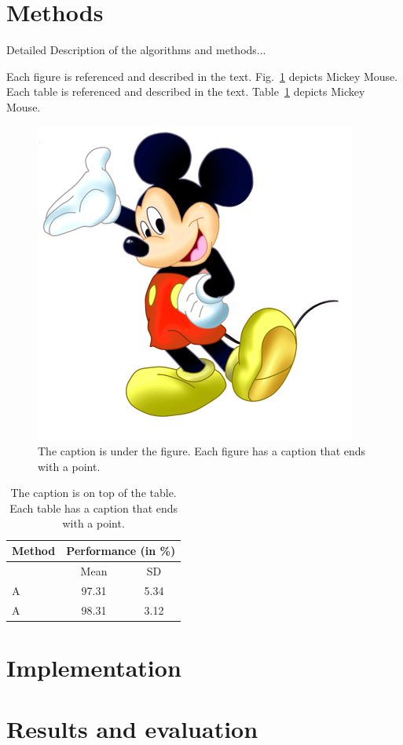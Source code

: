 \documentclass[12pt,onecolumn]{article}
\begin{document}
\newpage
\section{Methods}
\label{sec:methods}

Detailed Description of the algorithms and methods...


Each figure is referenced and described in the text. Fig.~\ref{fig:01} depicts Mickey Mouse.
Each table is referenced and described in the text. Table~\ref{table:01} depicts Mickey Mouse.

\begin{figure}[h]
\centering %
\includegraphics[width=0.5\columnwidth]{mickey.png}
\caption{The caption is under the figure. Each figure has a caption that ends with a point.}
\label{fig:01}
\end{figure}

\begin{table}[h]
\caption{The caption is on top of the table. Each table has a caption that ends with a point.}
\centering
\begin{tabular}{|l|cc|}
\hline
Method & \multicolumn{2}{c}{Performance (in \%)}  \\	\hline
   & Mean & SD \\
A  &  97.31   &	5.34	\\
A  &  98.31   &	3.12	\\
\hline
\end{tabular}
\label{table:01}
\end{table}

\newpage
\section{Implementation}
\label{sec:implementation}

\newpage
\section{Results and evaluation}
\label{sec:results}
\end{document}
